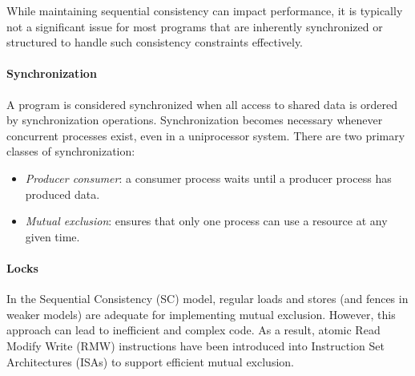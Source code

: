 While maintaining sequential consistency can impact performance, it is typically not a significant issue for most programs that are inherently synchronized or structured to handle such consistency constraints effectively.

\paragraph*{Synchronization}
A program is considered synchronized when all access to shared data is ordered by synchronization operations.
Synchronization becomes necessary whenever concurrent processes exist, even in a uniprocessor system. 
There are two primary classes of synchronization:
\begin{itemize}
    \item \textit{Producer consumer}: a consumer process waits until a producer process has produced data.
    \item \textit{Mutual exclusion}: ensures that only one process can use a resource at any given time.
\end{itemize}

\paragraph*{Locks}
In the Sequential Consistency (SC) model, regular loads and stores (and fences in weaker models) are adequate for implementing mutual exclusion. 
However, this approach can lead to inefficient and complex code. 
As a result, atomic Read Modify Write (RMW) instructions have been introduced into Instruction Set Architectures (ISAs) to support efficient mutual exclusion.